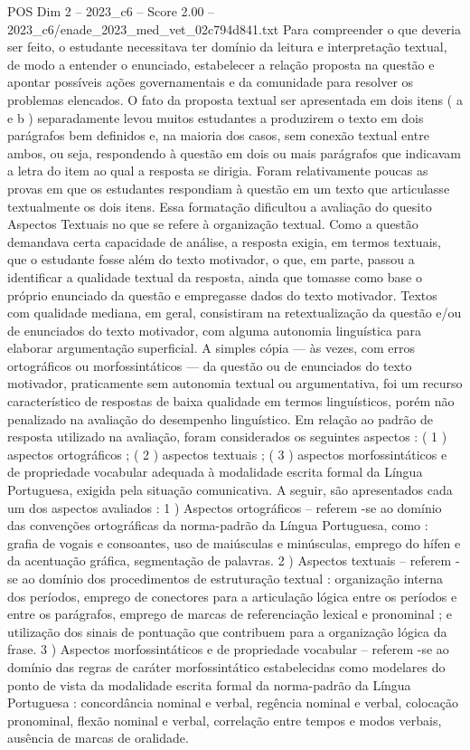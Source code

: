 \begin{textsample}{POS Dim 2 – 2023\_c6 – Score 2.00 – 2023\_c6/enade\_2023\_med\_vet\_02c794d841.txt}
Para compreender o que deveria ser feito, o estudante necessitava ter domínio da leitura e interpretação textual, de modo a entender o enunciado, estabelecer a relação proposta na questão e apontar possíveis ações governamentais e da comunidade para resolver os problemas elencados.
O fato da proposta textual ser apresentada em dois itens ( a e b ) separadamente levou muitos estudantes a produzirem o texto em dois parágrafos bem definidos e, na maioria dos casos, sem conexão textual entre ambos, ou seja, respondendo à questão em dois ou mais parágrafos que indicavam a letra do item ao qual a resposta se dirigia.
Foram relativamente poucas as provas em que os estudantes respondiam à questão em um texto que articulasse textualmente os dois itens.
Essa formatação dificultou a avaliação do quesito Aspectos Textuais no que se refere à organização textual.
Como a questão demandava certa capacidade de análise, a resposta exigia, em termos textuais, que o estudante fosse além do texto motivador, o que, em parte, passou a identificar a qualidade textual da resposta, ainda que tomasse como base o próprio enunciado da questão e empregasse dados do texto motivador.
Textos com qualidade mediana, em geral, consistiram na retextualização da questão e/ou de enunciados do texto motivador, com alguma autonomia linguística para elaborar argumentação superficial.
A simples cópia — às vezes, com erros ortográficos ou morfossintáticos — da questão ou de enunciados do texto motivador, praticamente sem autonomia textual ou argumentativa, foi um recurso característico de respostas de baixa qualidade em termos linguísticos, porém não penalizado na avaliação do desempenho linguístico.
Em relação ao padrão de resposta utilizado na avaliação, foram considerados os seguintes aspectos : ( 1 ) aspectos ortográficos ; ( 2 ) aspectos textuais ; ( 3 ) aspectos morfossintáticos e de propriedade vocabular adequada à modalidade escrita formal da Língua Portuguesa, exigida pela situação comunicativa.
A seguir, são apresentados cada um dos aspectos avaliados : 1 ) Aspectos ortográficos – referem -se ao domínio das convenções ortográficas da norma-padrão da Língua Portuguesa, como : grafia de vogais e consoantes, uso de maiúsculas e minúsculas, emprego do hífen e da acentuação gráfica, segmentação de palavras. 2 ) Aspectos textuais – referem -se ao domínio dos procedimentos de estruturação textual : organização interna dos períodos, emprego de conectores para a articulação lógica entre os períodos e entre os parágrafos, emprego de marcas de referenciação lexical e pronominal ; e utilização dos sinais de pontuação que contribuem para a organização lógica da frase. 3 ) Aspectos morfossintáticos e de propriedade vocabular – referem -se ao domínio das regras de caráter morfossintático estabelecidas como modelares do ponto de vista da modalidade escrita formal da norma-padrão da Língua Portuguesa : concordância nominal e verbal, regência nominal e verbal, colocação pronominal, flexão nominal e verbal, correlação entre tempos e modos verbais, ausência de marcas de oralidade.

\end{textsample}
